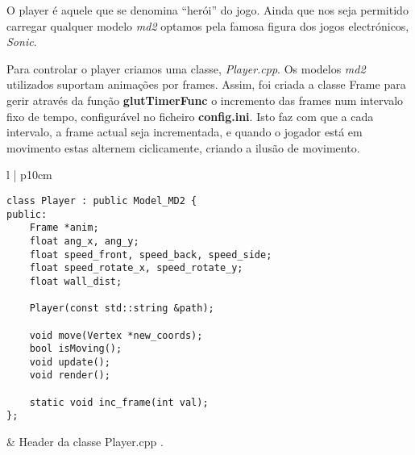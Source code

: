 
O player é aquele que se denomina ``herói'' do jogo. Ainda que nos seja permitido carregar qualquer modelo \textit{md2} optamos pela famosa figura dos jogos electrónicos, \textit{Sonic}.

Para controlar o player criamos uma classe, \textit{Player.cpp}.
Os modelos \textit{md2} utilizados suportam animações por frames. Assim, foi criada a classe Frame para gerir através da função \textbf{glutTimerFunc} o incremento das frames num intervalo fixo de tempo, configurável no ficheiro \textbf{config.ini}. Isto faz com que a cada intervalo, a frame actual seja incrementada, e quando o jogador está em movimento estas alternem ciclicamente, criando a ilusão de movimento.

\-
\begin{tabular} {l | p{10cm}}
\begin{lstlisting}
class Player : public Model_MD2 {
public:
    Frame *anim;
    float ang_x, ang_y;
    float speed_front, speed_back, speed_side;
    float speed_rotate_x, speed_rotate_y;
    float wall_dist;

    Player(const std::string &path);

    void move(Vertex *new_coords);
    bool isMoving();
    void update();
    void render();
    
    static void inc_frame(int val);
};
\end{lstlisting} 
&
Header da classe Player.cpp .\\
\end{tabular}
